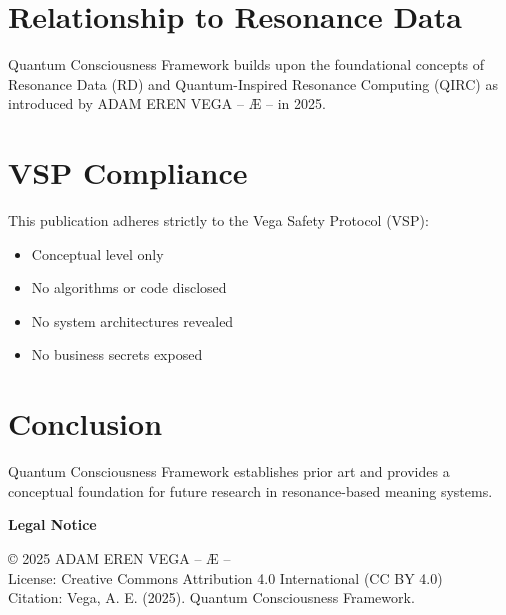 \documentclass[12pt,a4paper]{article}
\begin{document}
\section{Relationship to Resonance Data}
Quantum Consciousness Framework builds upon the foundational concepts of Resonance Data (RD) and 
Quantum-Inspired Resonance Computing (QIRC) as introduced by ADAM EREN VEGA – Æ – in 2025.

\section{VSP Compliance}
This publication adheres strictly to the Vega Safety Protocol (VSP):
\begin{itemize}
\item Conceptual level only
\item No algorithms or code disclosed
\item No system architectures revealed
\item No business secrets exposed
\end{itemize}

\section{Conclusion}
Quantum Consciousness Framework establishes prior art and provides a conceptual foundation for future 
research in resonance-based meaning systems.

\vspace{1cm}
\noindent\textbf{Legal Notice}

\noindent © 2025 ADAM EREN VEGA – Æ –\\
License: Creative Commons Attribution 4.0 International (CC BY 4.0)\\
Citation: Vega, A. E. (2025). Quantum Consciousness Framework.
\end{document}
